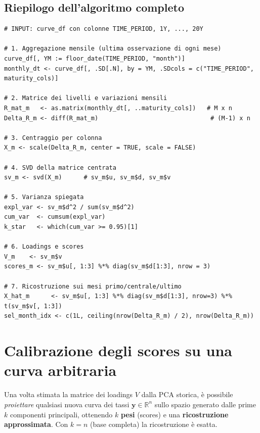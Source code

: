 \documentclass[11pt,a4paper]{article}
\theoremstyle{plain}
\theoremstyle{definition}
\theoremstyle{remark}
\begin{document}
\subsection{Riepilogo dell'algoritmo completo}

\begin{algobox}
\begin{Verbatim}[fontsize=\small]
# INPUT: curve_df con colonne TIME_PERIOD, 1Y, ..., 20Y

# 1. Aggregazione mensile (ultima osservazione di ogni mese)
curve_df[, YM := floor_date(TIME_PERIOD, "month")]
monthly_dt <- curve_df[, .SD[.N], by = YM, .SDcols = c("TIME_PERIOD", maturity_cols)]

# 2. Matrice dei livelli e variazioni mensili
R_mat_m   <- as.matrix(monthly_dt[, ..maturity_cols])   # M x n
Delta_R_m <- diff(R_mat_m)                               # (M-1) x n

# 3. Centraggio per colonna
X_m <- scale(Delta_R_m, center = TRUE, scale = FALSE)

# 4. SVD della matrice centrata
sv_m <- svd(X_m)      # sv_m$u, sv_m$d, sv_m$v

# 5. Varianza spiegata
expl_var <- sv_m$d^2 / sum(sv_m$d^2)
cum_var  <- cumsum(expl_var)
k_star   <- which(cum_var >= 0.95)[1]

# 6. Loadings e scores
V_m    <- sv_m$v
scores_m <- sv_m$u[, 1:3] %*% diag(sv_m$d[1:3], nrow = 3)

# 7. Ricostruzione sui mesi primo/centrale/ultimo
X_hat_m      <- sv_m$u[, 1:3] %*% diag(sv_m$d[1:3], nrow=3) %*% t(sv_m$v[, 1:3])
sel_month_idx <- c(1L, ceiling(nrow(Delta_R_m) / 2), nrow(Delta_R_m))
\end{Verbatim}
\end{algobox}


\section{Calibrazione degli scores su una curva arbitraria}
\label{sec:calibrazione}

Una volta stimata la matrice dei loadings $V$ dalla PCA storica, è possibile
\emph{proiettare} qualsiasi nuova curva dei tassi $\mathbf{y} \in \mathbb{R}^n$
sullo spazio generato dalle prime $k$ componenti principali, ottenendo
$k$ \textbf{pesi} (scores) e una \textbf{ricostruzione approssimata}.
Con $k = n$ (base completa) la ricostruzione è esatta.
\end{document}
